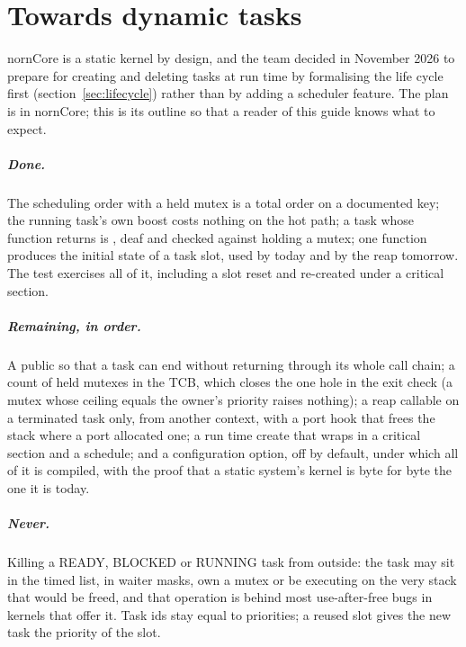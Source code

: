 \chapter{Towards dynamic tasks}
\label{app:roadmap}

nornCore is a static kernel by design, and the team decided in November 2026 to prepare
for creating and deleting tasks at run time by formalising the life cycle first
(section~\ref{sec:lifecycle}) rather than by adding a scheduler feature. The plan is
 in nornCore; this is its outline so that a reader
of this guide knows what to expect.

\paragraph{Done.} The scheduling order with a held mutex is a total order on a
documented key; the running task's own boost costs nothing on the hot path; a task whose
function returns is , deaf and checked against holding a
mutex; one function produces the initial state of a task slot, used by 
today and by the reap tomorrow. The test  exercises all of it,
including a slot reset and re-created under a critical section.

\paragraph{Remaining, in order.} A public  so that a task can end
without returning through its whole call chain; a count of held mutexes in the TCB,
which closes the one hole in the exit check (a mutex whose ceiling equals the owner's
priority raises nothing); a reap callable on a terminated task only, from another
context, with a port hook that frees the stack where a port allocated one; a run time
create that wraps  in a critical section and a schedule; and a
configuration option, off by default, under which all of it is compiled, with the proof
that a static system's kernel is byte for byte the one it is today.

\paragraph{Never.} Killing a READY, BLOCKED or RUNNING task from outside: the task may
sit in the timed list, in waiter masks, own a mutex or be executing on the very stack
that would be freed, and that operation is behind most use-after-free bugs in kernels
that offer it. Task ids stay equal to priorities; a reused slot gives the new task the
priority of the slot.
